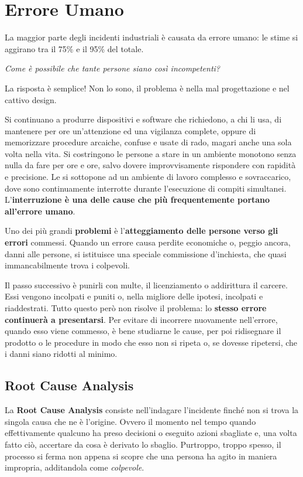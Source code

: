 
\chapter{Errore Umano}

La maggior parte degli incidenti industriali è causata da errore umano:
le stime si aggirano tra il 75\% e il 95\% del totale.

\begin{flushleft}
	\textit{Come è possibile che tante persone siano così incompetenti?}
\end{flushleft}

La risposta è semplice! Non lo sono, il problema è nella mal progettazione e nel cattivo design.

Si continuano a produrre dispositivi e software che richiedono, a chi li usa, di mantenere per ore un'attenzione ed una vigilanza complete, oppure di memorizzare procedure arcaiche, confuse e usate di rado, magari anche una sola volta nella vita. Si costringono le persone a stare in un ambiente monotono senza nulla da fare per ore e ore, salvo dovere improvvisamente rispondere con rapidità e precisione. Le si sottopone ad un ambiente di lavoro complesso e sovraccarico, dove sono continuamente interrotte durante l'esecuzione di compiti simultanei. L'\textbf{interruzione è una delle cause che più frequentemente portano all'errore umano}.

Uno dei più grandi \textbf{problemi} è l'\textbf{atteggiamento delle persone verso gli errori} commessi. Quando un errore causa perdite economiche o, peggio ancora, danni alle persone, si istituisce una speciale commissione d'inchiesta, che quasi immancabilmente trova i colpevoli.

Il passo successivo è punirli con multe, il licenziamento o addirittura il carcere. Essi vengono incolpati
e puniti o, nella migliore delle ipotesi, incolpati e riaddestrati. Tutto questo però non
risolve il problema: lo \textbf{stesso errore continuerà a presentarsi}.  Per evitare di incorrere nuovamente nell'errore, quando esso viene commesso, è bene  studiarne le cause, per poi ridisegnare il prodotto o le procedure in modo che esso non si ripeta o, se dovesse ripetersi, che i danni siano ridotti al minimo.

\section{Root Cause Analysis}
La \textbf{Root Cause Analysis} consiste nell'indagare l'incidente finché non si trova la singola causa che ne è l'origine. Ovvero il momento nel tempo quando effettivamente qualcuno ha preso decisioni o eseguito azioni sbagliate e,
una volta fatto ciò, accertare da cosa è derivato lo sbaglio. Purtroppo, troppo spesso, il processo si ferma non appena si scopre che una persona ha agito in maniera impropria, additandola come \textit{colpevole}.

